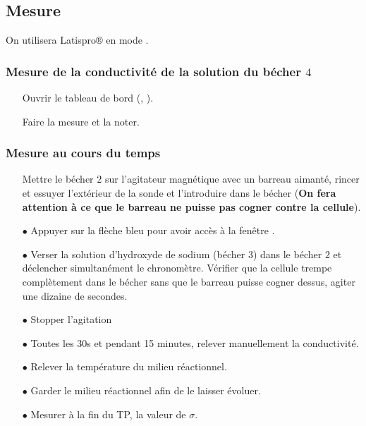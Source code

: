 \documentclass{tp}
\begin{document}
\subsection{Mesure}

On utilisera Latispro$\circledR$ en mode .

\subsubsection{Mesure de la conductivité de la solution du bécher $4$}

\begin{itemize}
\item [\textbullet] Ouvrir le tableau de bord (, ).

\item [\textbullet] Faire la mesure et la noter.
\end{itemize}

\subsubsection{Mesure au cours du temps}

\begin{itemize}
\item[\textbullet] Mettre le bécher $2$ sur l'agitateur magnétique avec un barreau aimanté, rincer et essuyer l'extérieur de la sonde et
l'introduire dans le bécher (\textbf{On fera attention à ce que le barreau ne puisse pas cogner contre la cellule}).

\item [$\bullet$] Appuyer sur la flèche bleu pour avoir accès à la fenêtre .
\item[$\bullet$] Verser la solution d'hydroxyde de sodium (bécher $3$) dans le bécher $2$ et déclencher simultanément le chronomètre. Vérifier que la cellule trempe complètement dans le bécher sans que le barreau puisse cogner dessus, agiter une dizaine de secondes.
\item[$\bullet$] Stopper l'agitation


\item [$\bullet$] Toutes les 30s et pendant 15 minutes, relever manuellement la conductivité.
\item[$\bullet$] Relever la température du milieu réactionnel.
\item[$\bullet$] Garder le milieu réactionnel afin de le laisser évoluer.
\item[$\bullet$] Mesurer à la fin du TP, la valeur de $\sigma$.
\end{itemize}
\end{document}
